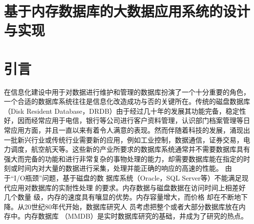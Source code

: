 \documentclass[literaturereview]{zjutreport}
\begin{document}



\frontmatter

\begingroup %
\let\clearpage\relax %

\titleformat{\chapter}[block]{\sihao\heiti\filcenter\bfseries}{\CJKnumber{\thechapter}}{1ex}{}{} %
\chapter*{基于内存数据库的大数据应用系统的设计与实现}
{} %


\mainmatter
\chapter{引言}
在信息化建设中用于对数据进行维护和管理的数据库扮演了一个十分重要的角色，一个合适的数据库系统往往是信息化改造成功与否的关键所在。传统的磁盘数据库（Disk Resident Database，DRDB）由于经过几十年的发展其功能完备，稳定性好，因而经常应用于电信，银行等公司进行客户资料管理，认识部门档案管理等日常应用方面，并且一直以来有着令人满意的表现。然而伴随着科技的发展，涌现出一批新兴行业或传统行业需要新的应用，例如工业控制，数据通信，证券交易，电力调度，航空航天等。这些新的产业所要求的数据库系统通常并不需要数据库具有强大而完备的功能和进行非常复杂的事物处理的能力，却需要数据库能在指定的时刻或时间内对大量的数据进行采集，处理并能正确的响应的高速的性能。
由于“I/O瓶颈”问题，基于磁盘的数
据库系统（Oracle，SQL Server等）不能满足现代应用对数据库的实耐性处理
的要求。内存数据与磁盘数据在访问时间上相差好几个数量
级，内存的速度具有嚷显的优势。内存容量增大，而价格
却在不断地下降。从20世纪80年代开始，数据库研究人
员考虑把整个或者大部分数据库放在内存中。内存数据库
（MMDB）是实时数据库研究的基础，井成为了研究的热点。
\end{document}
